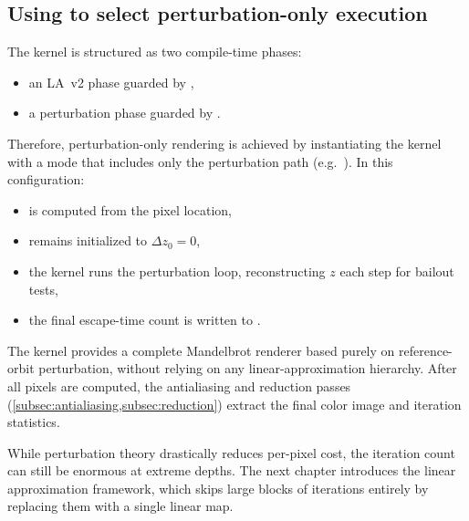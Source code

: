 \subsection{Using  to select perturbation-only execution}
\label{sec:perturb-only-mode}

The kernel is structured as two compile-time phases:
\begin{itemize}
\item an LA~v2 phase guarded by ,
\item a perturbation phase guarded by .
\end{itemize}
Therefore, perturbation-only rendering is achieved by instantiating the kernel
with a mode that includes only the perturbation path (e.g.\ ).
In this configuration:
\begin{itemize}
\item {} is computed from the pixel location,
\item {} remains initialized to \(\Delta z_0 = 0\),
\item the kernel runs the perturbation loop, reconstructing \(z\) each step for
      bailout tests,
\item the final escape-time count is written to .
\end{itemize}
The kernel provides a complete Mandelbrot renderer based purely on reference-orbit
perturbation, without relying on any linear-approximation hierarchy.
After all pixels are computed, the antialiasing and reduction passes
(\cref{subsec:antialiasing,subsec:reduction}) extract the final color
image and iteration statistics.

While perturbation theory drastically reduces per-pixel cost, the iteration
count can still be enormous at extreme depths.  The next chapter introduces
the linear approximation framework, which skips large blocks of iterations
entirely by replacing them with a single linear map.
